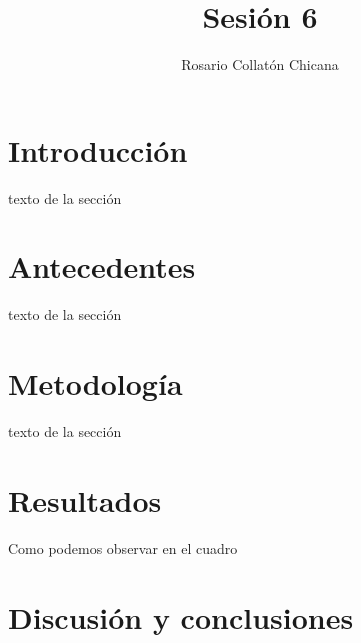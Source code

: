 \documentclass[12pt,a4paper]{article}
\author{Rosario Collatón Chicana}
\title{Sesión 6}
\begin{document}
\maketitle
\tableofcontents

\section{Introducción}
texto de la sección
\newpage
\section{Antecedentes}
texto de la sección
\newpage
\section{Metodología}
texto de la sección
\newpage
\section{Resultados}
Como podemos observar en el cuadro 

\newpage
\section{Discusión y conclusiones}
\end{document}
